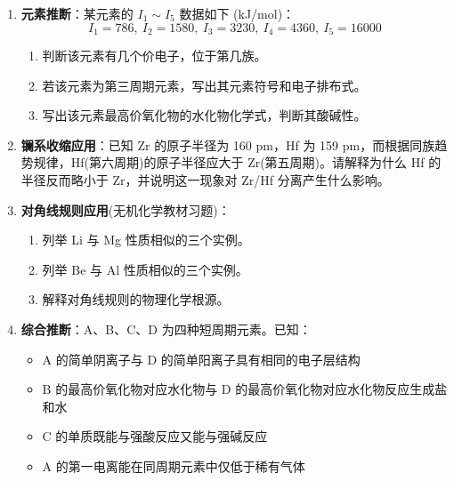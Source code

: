 \documentclass[a4paper,11pt]{ctexart}
\providecommand{\tightlist}{\setlength{\itemsep}{0pt}\setlength{\parskip}{0pt}}
\newcommand{\箭}{\ensuremath{\rightarrow}}
\newcommand{\左箭}{\ensuremath{\leftarrow}}
\newcommand{\上箭}{\ensuremath{\uparrow}}
\newcommand{\下箭}{\ensuremath{\downarrow}}
\newcommand{\衡}{\ensuremath{\rightleftharpoons}}
\newcommand{\双箭}{\ensuremath{\leftrightarrow}}
\newcommand{\约等于}{\ensuremath{\approx}}
\newcommand{\小于等于}{\ensuremath{\leq}}
\newcommand{\大于等于}{\ensuremath{\geq}}
\newcommand{\不等于}{\ensuremath{\neq}}
\newcommand{\西格马}{\ensuremath{\sigma}}
\newcommand{\派}{\ensuremath{\pi}}
\begin{document}
\begin{enumerate}
  \begin{enumerate}
  \def\labelenumii{(\arabic{enumii})}
  \tightlist
  \item
    解释为什么 Mg 的第一电离能大于 Al。
  \item
    解释为什么 P 的第一电离能大于 S。
  \item
    解释为什么 F 的电负性大于 Cl，但电子亲和能 Cl 大于 F。
  \end{enumerate}
\item
  \textbf{元素推断}：某元素的 \(I_1\sim I_5\) 数据如下 (kJ/mol)：
  \[I_1=786,\ I_2=1580,\ I_3=3230,\ I_4=4360,\ I_5=16000\]

  \begin{enumerate}
  \def\labelenumii{(\arabic{enumii})}
  \tightlist
  \item
    判断该元素有几个价电子，位于第几族。
  \item
    若该元素为第三周期元素，写出其元素符号和电子排布式。
  \item
    写出该元素最高价氧化物的水化物化学式，判断其酸碱性。
  \end{enumerate}
\item
  \textbf{镧系收缩应用}：已知 Zr 的原子半径为 160 pm，Hf 为 159 pm，而根据同族趋势规律，Hf(第六周期)的原子半径应大于 Zr(第五周期)。请解释为什么 Hf 的半径反而略小于 Zr，并说明这一现象对 Zr/Hf 分离产生什么影响。
\item
  \textbf{对角线规则应用}(无机化学教材习题)：

  \begin{enumerate}
  \def\labelenumii{(\arabic{enumii})}
  \tightlist
  \item
    列举 Li 与 Mg 性质相似的三个实例。
  \item
    列举 Be 与 Al 性质相似的三个实例。
  \item
    解释对角线规则的物理化学根源。
  \end{enumerate}
\item
  \textbf{综合推断}：A、B、C、D 为四种短周期元素。已知：

  \begin{itemize}
  \tightlist
  \item
    A 的简单阴离子与 D 的简单阳离子具有相同的电子层结构
  \item
    B 的最高价氧化物对应水化物与 D 的最高价氧化物对应水化物反应生成盐和水
  \item
    C 的单质既能与强酸反应又能与强碱反应
  \item
    A 的第一电离能在同周期元素中仅低于稀有气体
  \end{itemize}


\end{enumerate}
\end{document}

